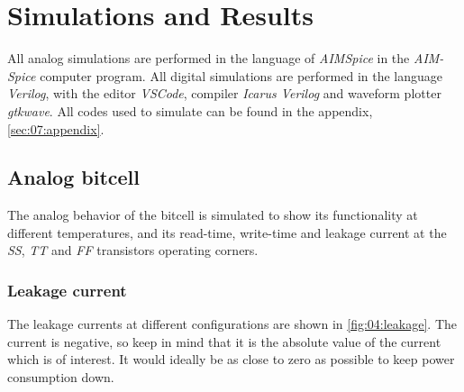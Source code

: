 \section{Simulations and Results}   \label{sec:04:results}
All analog simulations are performed in the language of \textit{AIMSpice} in the \textit{AIM-Spice} computer program. All digital simulations are performed in the language \textit{Verilog}, with the editor \textit{VSCode}, compiler \textit{Icarus Verilog} and waveform plotter \textit{gtkwave}. All codes used to simulate can be found in the appendix, \autoref{sec:07:appendix}.

\subsection{Analog bitcell}
The analog behavior of the bitcell is simulated to show its functionality at different temperatures, and its read-time, write-time and leakage current at the \textit{SS}, \textit{TT} and \textit{FF} transistors operating corners.

\subsubsection{Leakage current}
The leakage currents at different configurations are shown in \autoref{fig:04:leakage}. The current is negative, so keep in mind that it is the absolute value of the current which is of interest. It would ideally be as close to zero as possible to keep power consumption down.

